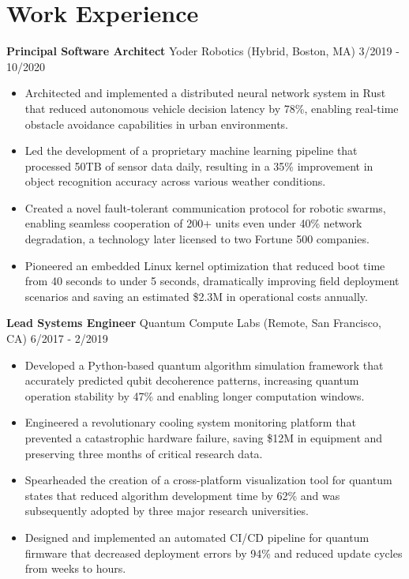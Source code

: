 \documentclass[11pt]{article}
\begin{document}
\section*{\headingfont Work Experience}

\noindent\textbf{Principal Software Architect} \textperiodcentered Yoder Robotics (Hybrid, Boston, MA) \hfill 3/2019 - 10/2020

\begin{itemize}[label=›, noitemsep, topsep=0pt, leftmargin=1em]
	\item Architected and implemented a distributed neural network system in Rust that reduced autonomous vehicle decision latency by 78\%, enabling real-time obstacle avoidance capabilities in urban environments.
	\item Led the development of a proprietary machine learning pipeline that processed 50TB of sensor data daily, resulting in a 35\% improvement in object recognition accuracy across various weather conditions.
	\item Created a novel fault-tolerant communication protocol for robotic swarms, enabling seamless cooperation of 200+ units even under 40\% network degradation, a technology later licensed to two Fortune 500 companies.
	\item Pioneered an embedded Linux kernel optimization that reduced boot time from 40 seconds to under 5 seconds, dramatically improving field deployment scenarios and saving an estimated \$2.3M in operational costs annually.
\end{itemize}

\noindent\textbf{Lead Systems Engineer} \textperiodcentered Quantum Compute Labs (Remote, San Francisco, CA) \hfill 6/2017 - 2/2019

\begin{itemize}[label=›, noitemsep, topsep=0pt, leftmargin=1em]
	\item Developed a Python-based quantum algorithm simulation framework that accurately predicted qubit decoherence patterns, increasing quantum operation stability by 47\% and enabling longer computation windows.
	\item Engineered a revolutionary cooling system monitoring platform that prevented a catastrophic hardware failure, saving \$12M in equipment and preserving three months of critical research data.
	\item Spearheaded the creation of a cross-platform visualization tool for quantum states that reduced algorithm development time by 62\% and was subsequently adopted by three major research universities.
	\item Designed and implemented an automated CI/CD pipeline for quantum firmware that decreased deployment errors by 94\% and reduced update cycles from weeks to hours.
\end{itemize}
\end{document}
